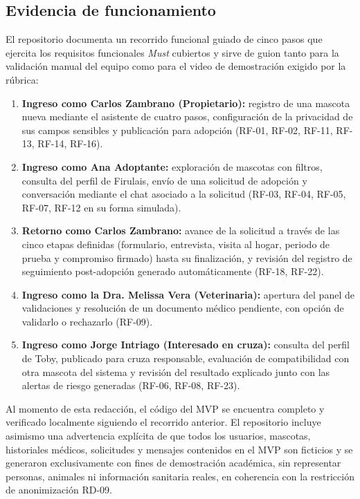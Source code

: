 \documentclass[journal,onecolumn]{IEEEtran}
\begin{document}
	\subsection{Evidencia de funcionamiento}
	\label{sec:mvp-evidencia}
	
	El repositorio documenta un recorrido funcional guiado de cinco pasos que
	ejercita los requisitos funcionales \emph{Must} cubiertos y sirve de guion
	tanto para la validación manual del equipo como para el video de
	demostración exigido por la rúbrica:
	
	\begin{enumerate}[leftmargin=*]
		\item \textbf{Ingreso como Carlos Zambrano (Propietario):} registro de
		una mascota nueva mediante el asistente de cuatro pasos, configuración
		de la privacidad de sus campos sensibles y publicación para adopción
		(RF-01, RF-02, RF-11, RF-13, RF-14, RF-16).
		\item \textbf{Ingreso como Ana Adoptante:} exploración de mascotas con
		filtros, consulta del perfil de Firulais, envío de una solicitud de
		adopción y conversación mediante el chat asociado a la solicitud
		(RF-03, RF-04, RF-05, RF-07, RF-12 en su forma simulada).
		\item \textbf{Retorno como Carlos Zambrano:} avance de la solicitud a
		través de las cinco etapas definidas (formulario, entrevista, visita al
		hogar, periodo de prueba y compromiso firmado) hasta su finalización, y
		revisión del registro de seguimiento post-adopción generado
		automáticamente (RF-18, RF-22).
		\item \textbf{Ingreso como la Dra. Melissa Vera (Veterinaria):}
		apertura del panel de validaciones y resolución de un documento médico
		pendiente, con opción de validarlo o rechazarlo (RF-09).
		\item \textbf{Ingreso como Jorge Intriago (Interesado en cruza):}
		consulta del perfil de Toby, publicado para cruza responsable,
		evaluación de compatibilidad con otra mascota del sistema y revisión
		del resultado explicado junto con las alertas de riesgo generadas
		(RF-06, RF-08, RF-23).
	\end{enumerate}
	
	Al momento de esta redacción, el código del MVP se encuentra completo y
	verificado localmente siguiendo el recorrido anterior. El repositorio
	incluye asimismo una advertencia explícita de que todos los usuarios,
	mascotas, historiales médicos, solicitudes y mensajes contenidos en el MVP
	son ficticios y se generaron exclusivamente con fines de demostración
	académica, sin representar personas, animales ni información sanitaria
	reales, en coherencia con la restricción de anonimización RD-09.
	
\end{document}
